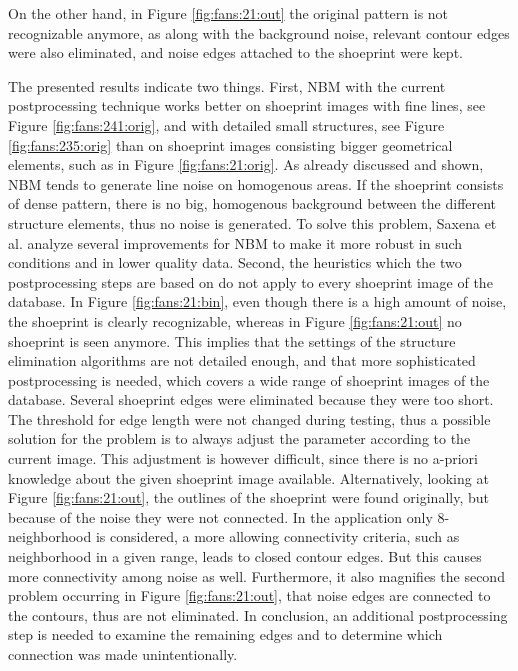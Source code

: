 \documentclass[draft,final]{vutinfth} %
\begin{document}
On the other hand, in Figure \ref{fig:fans:21:out} the original pattern is not recognizable anymore, as along with the background noise, relevant contour edges were also eliminated, and noise edges attached to the shoeprint were kept.
\par
The presented results indicate two things.
First, NBM with the current postprocessing technique works better on shoeprint images with fine lines, see Figure \ref{fig:fans:241:orig}, and with detailed small structures, see Figure \ref{fig:fans:235:orig} than on shoeprint images consisting bigger geometrical elements, such as in Figure \ref{fig:fans:21:orig}.
As already discussed and shown, NBM tends to generate line noise on homogenous areas.
If the shoeprint consists of dense pattern, there is no big, homogenous background between the different structure elements, thus no noise is generated.
To solve this problem, Saxena et al. \cite{saxena2019niblack} analyze several improvements for NBM to make it more robust in such conditions and in lower quality data.
Second, the heuristics which the two postprocessing steps are based on do not apply to every shoeprint image of the database.
In Figure  \ref{fig:fans:21:bin}, even though there is a high amount of noise, the shoeprint is clearly recognizable, whereas in Figure \ref{fig:fans:21:out} no shoeprint is seen anymore.
This implies that the settings of the structure elimination algorithms are not detailed enough, and that more sophisticated postprocessing is needed, which covers a wide range of shoeprint images of the database.
Several shoeprint edges were eliminated because they were too short.
The threshold for edge length were not changed during testing, thus a possible solution for the problem is to always adjust the parameter according to the current image.
This adjustment is however difficult, since there is no a-priori knowledge about the given shoeprint image available.
Alternatively, looking at Figure  \ref{fig:fans:21:out}, the outlines of the shoeprint were found originally, but because of the noise they were not connected.
In the application only 8-neighborhood is considered, a more allowing connectivity criteria, such as neighborhood in a given range, leads to closed contour edges.
But this causes more connectivity among noise as well.
Furthermore, it also magnifies the second problem occurring in Figure \ref{fig:fans:21:out}, that noise edges are connected to the contours, thus are not eliminated.
In conclusion, an additional postprocessing step is needed to examine the remaining edges and to determine which connection was made unintentionally.
\end{document}
